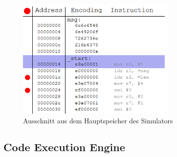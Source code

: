 \documentclass[a4paper, 11pt, onecolumn]{article}
\begin{document}
\begin{figure}[!htb]
\centering
\includegraphics[width=0.7\textwidth]{data/memory}
\caption{Ausschnitt aus dem Hauptspeicher des Simulators}
\label{fig:memory}
\end{figure}

\subsection{Code Execution Engine}\label{sec:codeExecEngine}
\end{document}
